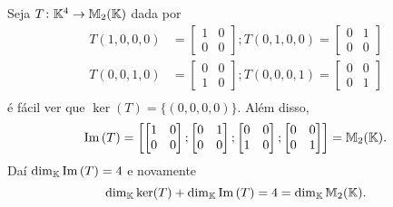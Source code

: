 \begin{exemplo}
    Seja $T \colon \mathbb{K}^4 \to \mathbb{M}_2(\mathbb{K})$ dada por
    \begin{align*}
        T(1,0,0,0) &= \begin{bmatrix}
        1 & 0\\
        0 & 0
        \end{bmatrix}; T(0,1,0,0) = \begin{bmatrix}
        0 & 1\\
        0 & 0
        \end{bmatrix}\\
        T(0,0,1,0) &= \begin{bmatrix}
        0 & 0\\
        1 & 0
        \end{bmatrix}; T(0,0,0,1) = \begin{bmatrix}
        0 & 0\\
        0 & 1
        \end{bmatrix}\\
    \end{align*}
    é fácil ver que $\ker(T) = \{(0,0,0,0)\}$. Além disso,
    \[
        {\rm Im\,}(T) = \left[\begin{bmatrix}
        1 & 0\\
        0 & 0
        \end{bmatrix};\begin{bmatrix}
        0 & 1\\
        0 & 0
        \end{bmatrix};\begin{bmatrix}
        0 & 0\\
        1 & 0
        \end{bmatrix};\begin{bmatrix}
        0 & 0\\
        0 & 1
        \end{bmatrix}\right] = \mathbb{M}_2(\mathbb{K}).
    \]
    Daí $\dim_{\mathbb{K}}{\rm Im\,}(T) = 4$ e novamente
    \[
        \dim_{\mathbb{K}}\ker(T) + \dim_{\mathbb{K}}{\rm Im\,}(T) = 4 = \dim_{\mathbb{K}}\mathbb{M}_2(\mathbb{K}).
    \]
\end{exemplo}

